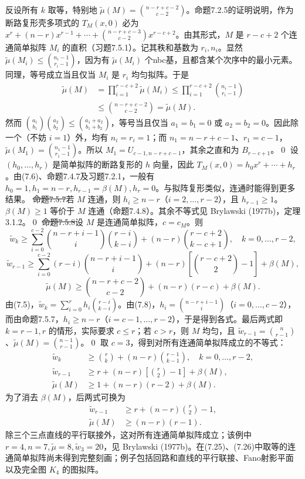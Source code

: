 反设所有 $k$ 取等，特别地 $\widetilde\mu(M)=\binom{n-r+c-2}{c-2}$。命题7.2.5的证明说明，作为断路复形壳多项式的 $T_M(x,0)$ 必为 $x^r+(n-r)x^{r-1}+\cdots+\binom{n-r+c-3}{c-2}x^{r-c+2}$。由其形式，$M$ 是 $r-c+2$ 个连通简单拟阵 $M_i$ 的直积（习题7.5.1）。记其秩和基数为 $r_i,n_i$。显然 $\widetilde\mu(M_i)\le\binom{n_i-1}{r_i-1}$，因为有 $\widetilde\mu(M_i)$ 个nbc基，且都含某个次序中的最小元素。同理，等号成立当且仅当 $M_i$ 是 $r_i$ 均匀拟阵。于是
\[\begin{aligned}
\widetilde\mu(M)&=\prod_{i=1}^{r-c+2}\widetilde\mu(M_i)
\le\prod_{i=1}^{r-c+2}\binom{n_i-1}{r_i-1}\\
&\le\binom{n-r+c-2}{c-2}=\widetilde\mu(M).
\end{aligned}\]
然而 $\binom{a_1}{b_1}\binom{a_2}{b_2}\le\binom{a_1+a_2}{b_1+b_2}$，等号当且仅当 $a_1=b_1=0$ 或 $a_2=b_2=0$。因此除一个（不妨 $i=1$）外，均有 $n_i=r_i=1$；而 $n_1=n-r+c-1$、$r_1=c-1$，$\widetilde\mu(M_1)=\binom{n_1-1}{r_1-1}$。所以 $M_1=U_{c-1,n-r+c-1}$，其余之直和为 $B_{r-c+1}$。\qed
{}
设 $(h_0,\ldots,h_r)$ 是简单拟阵的断路复形的 $h$ 向量，因此 $T_M(x,0)=h_0x^r+\cdots+h_r$。由(7.6)、命题7.4.7及习题7.2.1，一般有 $h_0=1,h_1=n-r,h_{r-1}=\beta(M),h_r=0$。与拟阵复形类似，连通时能得到更多结果。
\st{命题7.5.7}若 $M$ 连通，则 $h_i\ge n-r$（$i=2,\ldots,r-2$），且 $h_{r-1}\ge1$。
\pr $\beta(M)\ge1$ 等价于 $M$ 连通（命题7.4.8）。其余不等式见 Brylawski (1977b)，定理3.1.2。\qed
\st{命题7.5.8}设 $M$ 是连通简单拟阵，$c=c_M$。则
\[\widetilde w_k\ge\sum_{i=0}^{c-2}\binom{n-r+i-1}{i}\binom{r-i}{k-i}+(n-r)\binom{r-c+2}{k-c+1},\quad k=0,\ldots,r-2,\]
\[\widetilde w_{r-1}\ge\sum_{i=0}^{c-2}(r-i)\binom{n-r+i-1}{i}+(n-r)\left[\binom{r-c+2}2-1\right]+\beta(M),\]
\[\widetilde\mu(M)\ge\binom{n-r+c-2}{c-2}+(n-r)(r-c)+\beta(M).\]
\pr 由(7.5)，$\widetilde w_k=\sum_{i=0}^rh_i\binom{r-i}{k-i}$。由(7.8)，$h_i=\binom{n-r+i-1}i$（$i=0,\ldots,c-2$），而由命题7.5.7，$h_i\ge n-r$（$i=c-1,\ldots,r-2$），于是得到各式。最后两式即 $k=r-1,r$ 的情形，实际要求 $c\le r$；若 $c>r$，则 $M$ 均匀，且 $\widetilde w_{r-1}=\binom n{r-1}$、$\widetilde\mu(M)=\binom{n-1}{r-1}$。\qed
取 $c=3$，得到对所有连通简单拟阵成立的不等式：
\[\begin{aligned}
\widetilde w_k&\ge\binom rk+(n-r)\binom{r-1}{k-1},\quad k=0,\ldots,r-2,\\
\widetilde w_{r-1}&\ge r+(n-r)\left[\binom r2-1\right]+\beta(M),\\
\widetilde\mu(M)&\ge1+(n-r)(r-2)+\beta(M).
\end{aligned}\tag{7.25}\]
为了消去 $\beta(M)$，后两式可换为
\[\begin{aligned}
\widetilde w_{r-1}&\ge r+(n-r)\binom r2-1,\\
\widetilde\mu(M)&\ge(n-r)(r-1).
\end{aligned}\tag{7.26}\]
除三个三点直线的平行联接外，这对所有连通简单拟阵成立；该例中 $r=4,n=7,\widetilde\mu=8,\widetilde w_3=20$，见 Brylawski (1977b)。在(7.25)、(7.26)中取等的连通简单拟阵尚未得到完整刻画；例子包括回路和直线的平行联接、Fano射影平面以及完全图 $K_4$ 的图拟阵。
